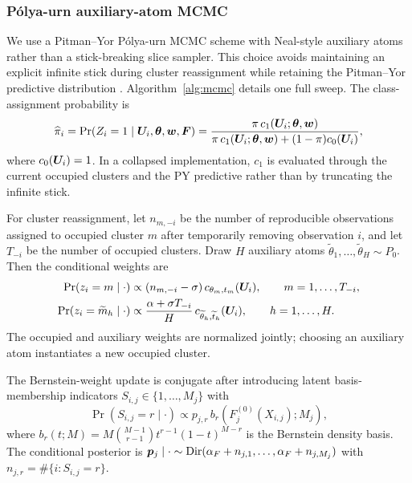 \subsubsection{P\'olya-urn auxiliary-atom MCMC}

We use a Pitman--Yor P\'olya-urn MCMC scheme with Neal-style auxiliary atoms rather than a stick-breaking slice sampler. This choice avoids maintaining an explicit infinite stick during cluster reassignment while retaining the Pitman--Yor predictive distribution \citep{Pitman1996BlackwellMacQueen,IshwaranJames2001}. Algorithm~\ref{alg:mcmc} details one full sweep. The class-assignment probability is
\begin{equation}
\widehat\pi_i = \Pr(Z_i=1\mid \bm{U}_i,\bm{\theta},\bm{w},\bm F)=
\frac{\pi\,c_1(\bm{U}_i;\bm{\theta},\bm{w})}{\pi\,c_1(\bm{U}_i;\bm{\theta},\bm{w})+(1-\pi)c_0(\bm{U}_i)},
\label{eq:cond-class}
\end{equation}
where $c_0(\bm{U}_i)=1$. In a collapsed implementation, $c_1$ is evaluated through the current occupied clusters and the PY predictive rather than by truncating the infinite stick.

For cluster reassignment, let $n_{m,-i}$ be the number of reproducible observations assigned to occupied cluster $m$ after temporarily removing observation $i$, and let $T_{-i}$ be the number of occupied clusters. Draw $H$ auxiliary atoms $\widetilde\theta_1,\ldots,\widetilde\theta_H\sim P_0$. Then the conditional weights are
\begin{align}
\Pr(z_i=m\mid\cdot) &\propto (n_{m,-i}-\sigma)\,c_{\theta_m,t_m}(\bm{U}_i),\qquad m=1,\ldots,T_{-i},\label{eq:py-occupied}\\
\Pr(z_i=\widetilde m_h\mid\cdot) &\propto \frac{\alpha+\sigma T_{-i}}{H}\,c_{\widetilde\theta_h,\widetilde t_h}(\bm{U}_i),\qquad h=1,\ldots,H.\label{eq:py-new}
\end{align}
The occupied and auxiliary weights are normalized jointly; choosing an auxiliary atom instantiates a new occupied cluster.

The Bernstein-weight update is conjugate after introducing latent basis-membership indicators $S_{i,j}\in\{1,\ldots,M_j\}$ with
\begin{equation}
\Pr(S_{i,j}=r\mid\cdot)\propto p_{j,r}\,b_r(F_j^{(0)}(X_{i,j});M_j),
\end{equation}
where $b_r(t;M)=M\binom{M-1}{r-1}t^{r-1}(1-t)^{M-r}$ is the Bernstein density basis. The conditional posterior is $\bm p_j\mid\cdot\sim\mathrm{Dir}(\alpha_F+n_{j,1},\ldots,\alpha_F+n_{j,M_j})$ with $n_{j,r}=\#\{i:S_{i,j}=r\}$.

